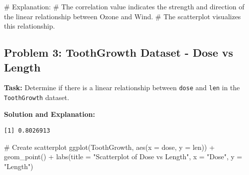\documentclass[
  letterpaper,
  DIV=11,
  numbers=noendperiod]{scrreprt}
\newenvironment{Shaded}{\begin{snugshade}}{\end{snugshade}}
\newcommand{\AttributeTok}[1]{\textcolor[rgb]{0.40,0.45,0.13}{#1}}
\newcommand{\CommentTok}[1]{\textcolor[rgb]{0.37,0.37,0.37}{#1}}
\newcommand{\FunctionTok}[1]{\textcolor[rgb]{0.28,0.35,0.67}{#1}}
\newcommand{\NormalTok}[1]{\textcolor[rgb]{0.00,0.23,0.31}{#1}}
\newcommand{\OtherTok}[1]{\textcolor[rgb]{0.00,0.23,0.31}{#1}}
\newcommand{\SpecialCharTok}[1]{\textcolor[rgb]{0.37,0.37,0.37}{#1}}
\newcommand{\StringTok}[1]{\textcolor[rgb]{0.13,0.47,0.30}{#1}}
\begin{document}
\begin{Shaded}
\begin{Highlighting}[]
\CommentTok{\# Explanation:}
\CommentTok{\# The correlation value indicates the strength and direction of the linear relationship between Ozone and Wind.}
\CommentTok{\# The scatterplot visualizes this relationship.}
\end{Highlighting}
\end{Shaded}

\subsection*{Problem 3: ToothGrowth Dataset - Dose vs
Length}\label{problem-3-toothgrowth-dataset---dose-vs-length}

\textbf{Task:} Determine if there is a linear relationship between
\texttt{dose} and \texttt{len} in the \texttt{ToothGrowth} dataset.

\textbf{Solution and Explanation:}

\begin{Shaded}
\end{Shaded}

\begin{verbatim}
[1] 0.8026913
\end{verbatim}

\begin{Shaded}
\begin{Highlighting}[]
\CommentTok{\# Create scatterplot}
\FunctionTok{ggplot}\NormalTok{(ToothGrowth, }\FunctionTok{aes}\NormalTok{(}\AttributeTok{x =}\NormalTok{ dose, }\AttributeTok{y =}\NormalTok{ len)) }\SpecialCharTok{+}
  \FunctionTok{geom\_point}\NormalTok{() }\SpecialCharTok{+}
  \FunctionTok{labs}\NormalTok{(}\AttributeTok{title =} \StringTok{"Scatterplot of Dose vs Length"}\NormalTok{, }\AttributeTok{x =} \StringTok{"Dose"}\NormalTok{, }\AttributeTok{y =} \StringTok{"Length"}\NormalTok{)}
\end{Highlighting}
\end{Shaded}
\end{document}

